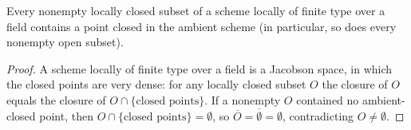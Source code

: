 \begin{lemma}
  \label{pa-lem:jacobson_closed_points}
  \leanok

  Every nonempty locally closed subset of a scheme locally of finite type over a
  field contains a point closed in the ambient scheme (in particular, so does
  every nonempty open subset).
\end{lemma}
\begin{proof}
  \leanok
  A scheme locally of finite type over a field is a Jacobson space, in which the
  closed points are very dense: for any locally closed subset \(O\) the closure
  of \(O\) equals the closure of \(O \cap \{\text{closed points}\}\). If a
  nonempty \(O\) contained no ambient-closed point, then \(O \cap \{\text{closed
  points}\} = \emptyset\), so \(\overline{O} = \overline{\emptyset} =
  \emptyset\), contradicting \(O \neq \emptyset\).
\end{proof}

